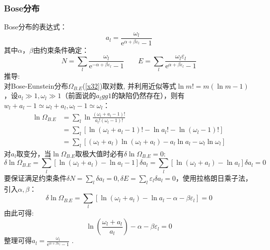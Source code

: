 \documentclass[12pt]{article}
\begin{document}
\subsubsection{Bose分布}
\noindent
Bose分布的表达式：
\begin{equation}
	a_l=\frac{\omega_l}{\mathrm{e}^{\alpha +\beta \varepsilon_l}-1}
\end{equation}
其中$\alpha$，$\beta$由约束条件确定：
\begin{equation}
	N=\sum_{l} \frac{\omega_l}{\mathrm{e}^{-\alpha+\beta\varepsilon_l}-1}\quad\quad E=\sum_{l} \frac{ \omega_l \varepsilon_l}{ \mathrm{e}^{\alpha+\beta\varepsilon_l}-1}
\end{equation}
推导:\\
对Bose-Eunstein分布$\Omega_{B.E}$(\ref{x32})取对数, 并利用近似等式$\ln m!=m(\ln m-1)$，设$a_l\gg 1, \omega_l\gg 1$（前面说的$a_lgg1$的缺陷仍然存在），则有$ w_l+a_l-1 \simeq \omega_l+a_l, \omega_l-1\simeq \omega_l$：
\begin{equation}
	\begin{split}
	\ln \Omega_{B.E}&=\sum_{l} \ln \frac{(\omega_l+a_l-1)!}{a_l! (\omega_l-1)!}\\
	&=\sum_{l} [\ln(\omega_l+a_l-1)!-\ln a_l!-\ln (\omega_l-1)!]\\
	&=\sum_{l} [(\omega_l+a_l)\ln(\omega_l+a_l)-a_l\ln a_l - \omega_l \ln \omega_l]
\end{split}
\end{equation}
对$a_l$取变分，当$\ln \Omega_{B.E}$取极大值时必有$\delta \ln \Omega_{B.E}=0$:
\begin{equation}
	\delta \ln \Omega_{B.E}=\sum_l [\ln (\omega_l+a_l)-\ln a_l-1]\delta a_l=\sum_l [\ln (\omega_l+a_l)-\ln a_l]\delta a_l=0
\end{equation}
要保证满足约束条件$\delta N=\sum_l \delta a_l =0, \delta E=\sum_{l} \varepsilon_l \delta a_l=0$，使用拉格朗日乘子法，引入$\alpha, \beta$：
\begin{equation}
	\delta \ln \Omega_{B.E}= \sum_l [\ln (\omega_l+a_l)-\ln a_l-\alpha -\beta \varepsilon_l]=0
\end{equation}
由此可得:
\begin{equation}
	\ln (\frac{\omega_l+a_l}{a_l})-\alpha-\beta \varepsilon_l=0
\end{equation}
整理可得$a_l=\frac{\omega_l}{\mathrm{e}^{\alpha+\beta \varepsilon_l}-1}$ .
\end{document}
